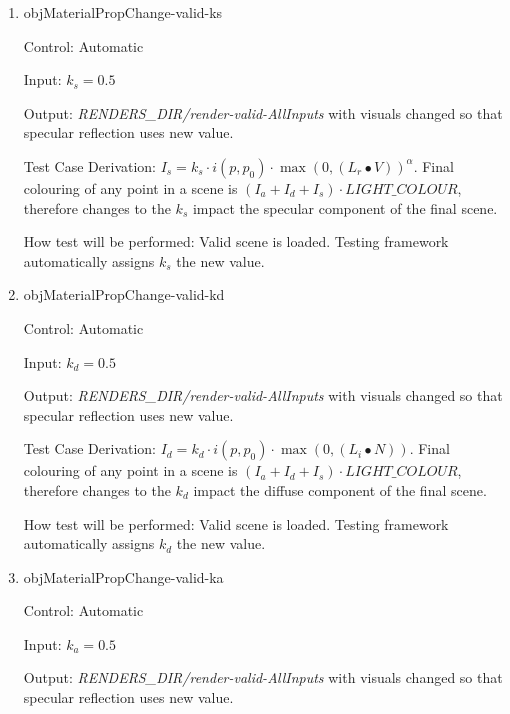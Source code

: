 \documentclass[12pt, titlepage]{article}
\begin{document}
\begin{enumerate}
	\item{objMaterialPropChange-valid-ks\\}
	
	Control: Automatic
	
	Input: $k_{s} = 0.5$
	
	Output: \textit{RENDERS\_DIR/render-valid-AllInputs} with visuals changed 
	so that specular reflection uses new value.
	
	Test Case Derivation: $I_{s} = k_{s}\cdot i(p,p_{0}) \cdot \max(0, 
	({L_{r}}\bullet V))^\alpha$. Final colouring of any point in a scene is 
	$(I_{a}+I_{d}+I_{s})\cdot LIGHT\_COLOUR$, therefore changes to the $k_{s}$ 
	impact the specular component of the final scene.
	
	How test will be performed: Valid scene is loaded. Testing framework 
	automatically assigns $k_{s}$ the new value. 
	
	\item{objMaterialPropChange-valid-kd\\}
	
	Control: Automatic
	
	Input: $k_{d} = 0.5$
	
	Output: \textit{RENDERS\_DIR/render-valid-AllInputs} with visuals changed 
	so that specular reflection uses new value.
	
	Test Case Derivation: $I_{d} = k_{d}\cdot i(p,p_{0}) \cdot 
	\max(0,(L_{i}\bullet N))$. Final colouring of any point in a scene is 
	$(I_{a}+I_{d}+I_{s})\cdot LIGHT\_COLOUR$, therefore changes to the $k_{d}$ 
	impact the diffuse component of the final scene.
	
	How test will be performed: Valid scene is loaded. Testing framework 
	automatically assigns $k_{d}$ the new value. 	

	\item{objMaterialPropChange-valid-ka\\}
	
	Control: Automatic
	
	Input: $k_{a} = 0.5$
	
	Output: \textit{RENDERS\_DIR/render-valid-AllInputs} with visuals changed 
	so that specular reflection uses new value.
	

\end{enumerate}
\end{document}
